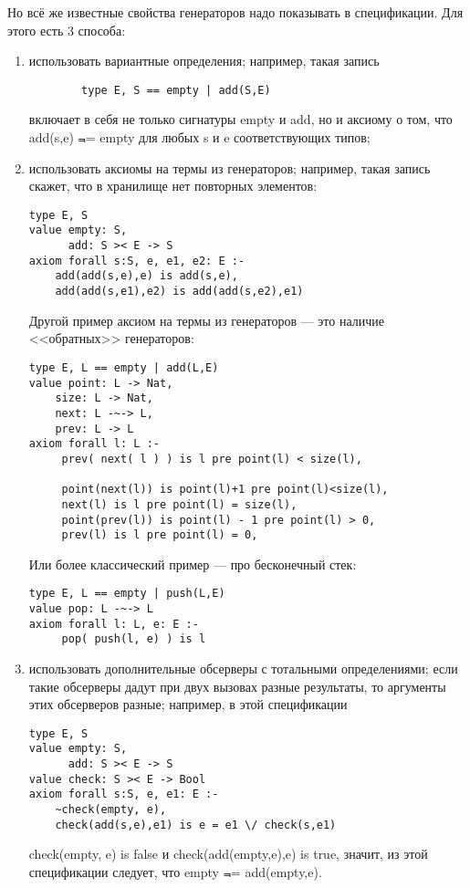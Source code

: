 Но всё же известные свойства генераторов надо показывать в спецификации. Для этого есть 3 способа:
\begin{enumerate}
  \item использовать вариантные определения; например, такая запись
      \begin{lstlisting}
        type E, S == empty | add(S,E)
      \end{lstlisting}
      включает в себя не только сигнатуры empty и add, но и аксиому о том, что add(s,e) $\Not$= empty для любых s и e соответствующих типов;

  \item использовать аксиомы на термы из генераторов; например, такая запись скажет, что в хранилище нет повторных элементов:
\begin{lstlisting}
type E, S
value empty: S,
      add: S >< E -> S
axiom forall s:S, e, e1, e2: E :-
    add(add(s,e),e) is add(s,e),
    add(add(s,e1),e2) is add(add(s,e2),e1)
\end{lstlisting}
     Другой пример аксиом на термы из генераторов --- это наличие <<обратных>> генераторов:
\begin{lstlisting}
type E, L == empty | add(L,E)
value point: L -> Nat,
    size: L -> Nat,
    next: L -~-> L,
    prev: L -> L
axiom forall l: L :-
     prev( next( l ) ) is l pre point(l) < size(l),
     
     point(next(l)) is point(l)+1 pre point(l)<size(l),
     next(l) is l pre point(l) = size(l),
     point(prev(l)) is point(l) - 1 pre point(l) > 0,
     prev(l) is l pre point(l) = 0,
\end{lstlisting}
Или более классический пример --- про бесконечный стек:
\begin{lstlisting}
type E, L == empty | push(L,E)
value pop: L -~-> L
axiom forall l: L, e: E :-
     pop( push(l, e) ) is l
\end{lstlisting}

   \item использовать дополнительные обсерверы с тотальными определениями; если такие обсерверы дадут при двух вызовах разные результаты, то аргументы этих обсерверов разные; например, в этой спецификации
\begin{lstlisting}
type E, S
value empty: S,
      add: S >< E -> S
value check: S >< E -> Bool
axiom forall s:S, e, e1: E :-
    ~check(empty, e),
    check(add(s,e),e1) is e = e1 \/ check(s,e1)
\end{lstlisting}
    check(empty, e) is false и check(add(empty,e),e) is true, значит, из этой спецификации следует, что empty $\Not$= add(empty,e).
\end{enumerate}

